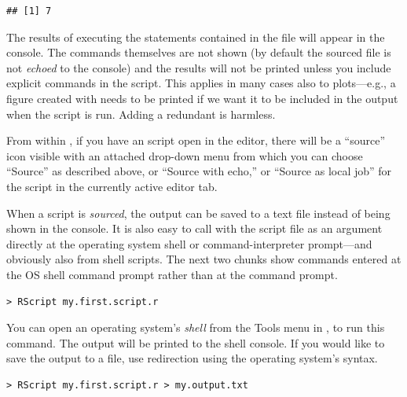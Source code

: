 \documentclass[krantz2]{krantz}\usepackage{knitr}
\begin{document}
\begin{knitrout}\footnotesize
{}\color{fgcolor}\begin{kframe}
\begin{alltt}
\hlstd{(}\hlstd{)}
\end{alltt}
\begin{verbatim}
## [1] 7
\end{verbatim}
\end{kframe}
\end{knitrout}

The results of executing the statements contained in the file will appear in the console. The commands themselves are not shown (by default the sourced file is not \emph{echoed} to the console) and the results will not be printed unless you include explicit  commands in the script. This applies in many cases also to plots---e.g., a figure created with  needs to be printed if we want it to be included in the output when the script is run. Adding a redundant  is harmless.

From within \RStudio, if you have an \Rpgrm script open in the editor, there will be a ``source'' icon visible with an attached drop-down menu from which you can choose ``Source'' as described above, or ``Source with echo,'' or ``Source as local job'' for the script in the currently active editor tab.

When a script is \emph{sourced}, the output can be saved to a text file instead of being shown in the console. It is also easy to call \Rpgrm with the \Rlang script file as an argument directly at the operating system shell or command-interpreter prompt---and obviously also from shell scripts. The next two chunks show commands entered at the OS shell command prompt rather than at the \Rlang command prompt.
\begin{shaded}
\footnotesize
\begin{verbatim}
> RScript my.first.script.r
\end{verbatim}
\end{shaded}

You can open an operating system's \emph{shell} from the Tools menu in \RStudio, to run this command. The output will be printed to the shell console. If you would like to save the output to a file, use redirection using the operating system's syntax.
\begin{shaded}
\footnotesize
\begin{verbatim}
> RScript my.first.script.r > my.output.txt
\end{verbatim}
\end{shaded}
\end{document}
